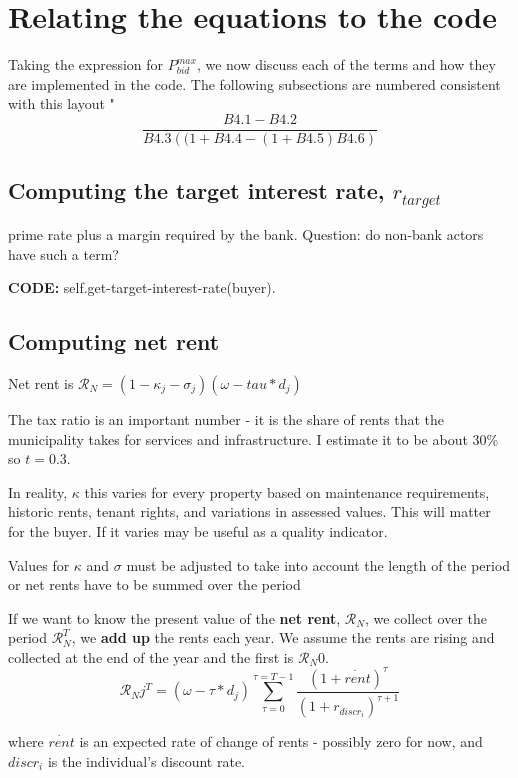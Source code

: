 \section{Relating the equations to the code}
Taking the expression for $P^{max}_{bid}$, we now discuss each of the terms and how they are implemented in the code. The following subsections are numbered consistent with this layout "
\[\frac{B4.1-B4.2}{B4.3\left( (1+B4.4 - (1+B4.5)B4.6\right)}\]

\subsection{Computing the target interest rate, $r_{target}$}
prime rate plus a margin required by the bank.  Question: do non-bank actors have such a term?

\textbf{CODE:}   self.get-target-interest-rate(buyer).


\subsection{Computing net rent}
Net rent is
$\mathcal{R}_N = (1-\kappa_j - \sigma_j) (\omega-tau*d_j)$


The tax ratio is an important number - it is the share of rents that the municipality takes for services and infrastructure. I estimate it to be about 30\% so $t=0.3$.


In reality, $\kappa$ this varies for every property based on maintenance requirements, historic rents, tenant rights, and variations in assessed values. This will matter for the buyer. If it varies may be useful as a quality indicator.

Values for $\kappa$ and $\sigma$ must be adjusted to take into account the length of the period or net rents have to be summed over the period


If we want to know the  present value  of the \textbf{net rent}, $\mathcal{R}_N$, we collect over the period  $\mathcal{R}_N^T$, we \textbf{add up} the rents each year. We assume the rents are rising and  collected at the end of the year and the first is $\mathcal{R}_N0$.
\[\mathcal{R}_Nj^T= (\omega-\tau*d_j)\sum_{\tau=0}^{\tau=T-1} \frac{(1+\dot{rent})^{\tau}} {(1+r_{discr_i})^{\tau+1}} \]

where $\dot{rent}$ is an expected rate of change of rents - possibly zero for now, and $discr_i$ is the individual's discount rate.

